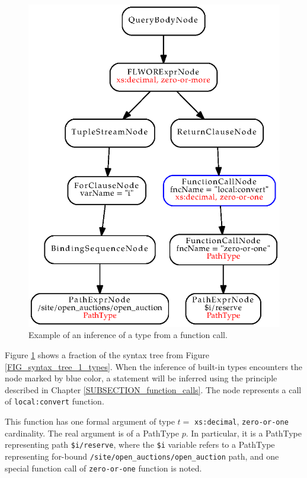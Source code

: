 \begin{figure}
\label{FIG_syntax_tree_1_types_type_inference}
\caption{Example of an inference of a type from a function call.}
\includegraphics[scale=1]{syntax_tree_1_types_type_inference.eps}
\end{figure}

Figure \ref{FIG_syntax_tree_1_types_type_inference} shows a fraction of the syntax tree from Figure \ref{FIG_syntax_tree_1_types}. When the inference of built-in types encounters the node marked by blue color, a statement will be inferred using the principle described in Chapter \ref{SUBSECTION_function_calls}. The node represents a call of \texttt{local:convert} function.

This function has one formal argument of type $t =$ \texttt{xs:decimal}, \texttt{zero-or-one} cardinality. The real argument is of a PathType $p$. In particular, it is a PathType representing path \texttt{\$i/reserve}, where the \texttt{\$i} variable refers to a PathType representing for-bound \texttt{/site/open\_auctions/open\_auction} path, and one special function call of \texttt{zero-or-one} function is noted.

